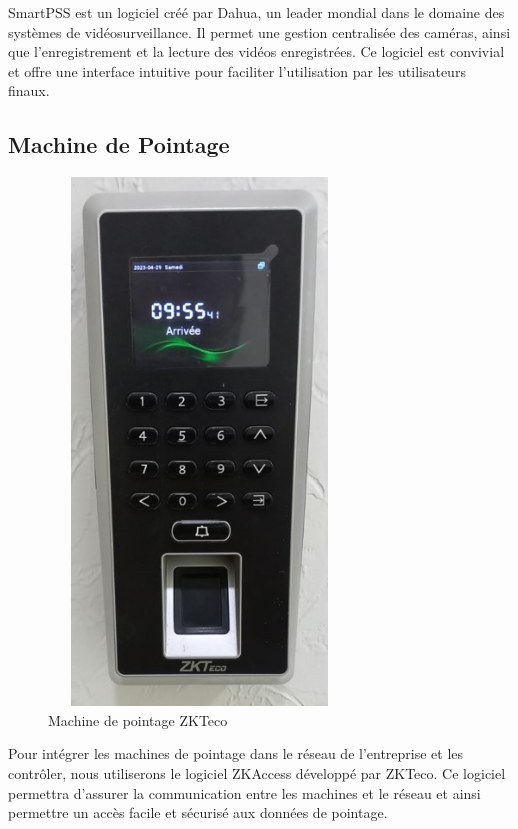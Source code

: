 SmartPSS est un logiciel créé par Dahua, un leader mondial dans le domaine des systèmes de vidéosurveillance. Il permet une gestion centralisée des caméras, ainsi que l'enregistrement et la lecture des vidéos enregistrées. Ce logiciel est convivial et offre une interface intuitive pour faciliter l'utilisation par les utilisateurs finaux. \\





\subsection{Machine de Pointage}

\begin{figure}[H]
 \centering
    \includegraphics[height=14cm,width=8cm]{Images/BRades-Pointage.jpg}
    \caption{Machine de pointage ZKTeco}
    \label{Chap4.2.5}
\end{figure}    
\smallskip

Pour intégrer les machines de pointage dans le réseau de l'entreprise et les contrôler, nous utiliserons le logiciel ZKAccess développé par ZKTeco. Ce logiciel permettra d'assurer la communication entre les machines et le réseau et ainsi permettre un accès facile et sécurisé aux données de pointage. \\

